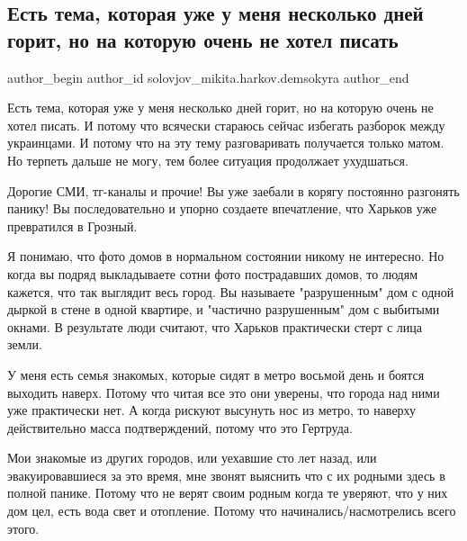  
 
 
 
 

\subsection{Есть тема, которая уже у меня несколько дней горит, но на которую очень не хотел писать}
\label{sec:15_03_2022.fb.solovjov_mikita.harkov.demsokyra.1.yest_tema__kotoraya_}

\ifcmt
 author_begin
   author_id solovjov_mikita.harkov.demsokyra
 author_end
\fi

Есть тема, которая уже у меня несколько дней горит, но на которую очень не
хотел писать. И потому что всячески стараюсь сейчас избегать разборок между
украинцами. И потому что на эту тему разговаривать получается только матом. Но
терпеть дальше не могу, тем более ситуация продолжает ухудшаться. 

Дорогие СМИ, тг-каналы и прочие! Вы уже заебали в корягу постоянно разгонять
панику! Вы последовательно и упорно создаете впечатление, что Харьков уже
превратился в Грозный. 

Я понимаю, что фото домов в нормальном состоянии никому не интересно. Но когда
вы подряд выкладываете сотни фото пострадавших домов, то людям кажется, что так
выглядит весь город. Вы называете "разрушенным" дом с одной дыркой в стене в
одной квартире, и "частично разрушенным" дом с выбитыми окнами. В результате
люди считают, что Харьков практически стерт с лица земли. 

У меня есть семья знакомых, которые сидят в метро восьмой день и боятся
выходить наверх. Потому что читая все это они уверены, что города над ними уже
практически нет. А когда рискуют высунуть нос из метро, то наверху
действительно масса подтверждений, потому что это Гертруда. 

Мои знакомые из других городов, или уехавшие сто лет назад, или
эвакуировавшиеся за это время, мне звонят выяснить что с их родными здесь в
полной панике. Потому что не верят своим родным когда те уверяют, что у них дом
цел, есть вода свет и отопление. Потому что начинались/насмотрелись всего
этого. 

